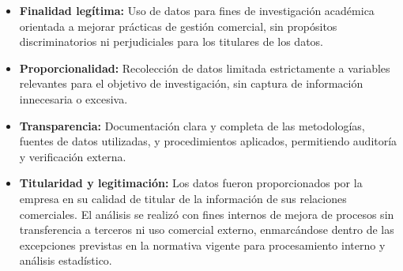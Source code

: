 \begin{itemize}
    \item \textbf{Finalidad legítima:} Uso de datos para fines de investigación académica orientada a mejorar prácticas de gestión comercial, sin propósitos discriminatorios ni perjudiciales para los titulares de los datos.
    
    \item \textbf{Proporcionalidad:} Recolección de datos limitada estrictamente a variables relevantes para el objetivo de investigación, sin captura de información innecesaria o excesiva.
    
    \item \textbf{Transparencia:} Documentación clara y completa de las metodologías, fuentes de datos utilizadas, y procedimientos aplicados, permitiendo auditoría y verificación externa.
    
    \item \textbf{Titularidad y legitimación:} Los datos fueron proporcionados por la empresa en su calidad de titular de la información de sus relaciones comerciales. El análisis se realizó con fines internos de mejora de procesos sin transferencia a terceros ni uso comercial externo, enmarcándose dentro de las excepciones previstas en la normativa vigente para procesamiento interno y análisis estadístico.
\end{itemize}